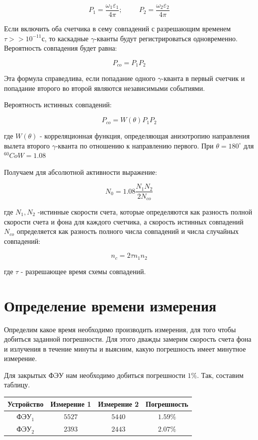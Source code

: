 \documentclass[12pt]{article}
\begin{document}
    $$
      P_1=\frac{\omega _1 \varepsilon _1}{4 \pi}; \hspace{1cm}
      P_2=\frac{\omega _2 \varepsilon _2}{4 \pi}
    $$

    Если включить оба счетчика в сему совпадений с разрешающим временем
    $\tau >> 10^{-11}$с, то каскадные $\gamma$-кванты будут регистрироваться
    одновременно. Вероятность совпадения будет равна:

    $$
      P_{co}=P_1P_2
    $$

    Эта формула справедлива, если попадание одного $\gamma$-кванта  в первый
    счетчик и попадание второго во второй являются независимыми событиями.

    Вероятность истинных совпадений:

    $$
      P_{co}=W(\theta)P_1P_2
    $$

    где $W(\theta)$ - корреляционная функция, определяющая анизотропию
    направления вылета второго $\gamma$-кванта по отношению к направлению
    первого. При $\theta = 180^{\circ}$ для $^{60}Co W=1.08$

    Получаем для абсолютной активности выражение:

    $$
      N_0=1.08 \frac{N_1N_2}{2N_{co}}
    $$

    где $N_1, N_2$ -истинные скорости счета, которые определяются как разность
    полной скорости счета и фона для каждого счетчика, а скорость истинных
    совпадений $N_{co}$ определяется как разность полного числа совпадений и
    числа случайных совпадений:

    $$
      n_c = 2 \tau n_1 n_2
    $$

    где $\tau$ - разрешающее время схемы совпадений.


  \section{Определение времени измерения}

    Определим какое время необходимо производить измерения, для того чтобы
    добиться заданной погрешности. Для этого дважды замерим скорость счета фона
    и излучения в течение минуты и выясним, какую погрешность имеет минутное
    измерение.

    Для закрытых ФЭУ нам необходимо добиться погрешности $1 \%$. Так, составим
    таблицу. \\

    \begin{tabular}{ || c || c | c | c ||}
      \hline
      Устройство & Измерение 1 & Измерение 2 & Погрешность \\ \hline
      ФЭУ$_1$ & $5527$ & $5440$ & $1.59 \%$ \\
      ФЭУ$_2$ & $2393$ & $2443$ & $2.07 \%$ \\
      \hline
    \end{tabular} \\
\end{document}
